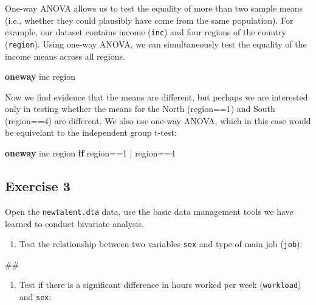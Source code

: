 \documentclass[
]{book}
\newenvironment{Shaded}{\begin{snugshade}}{\end{snugshade}}
\newcommand{\KeywordTok}[1]{\textcolor[rgb]{0.13,0.29,0.53}{\textbf{#1}}}
\newcommand{\NormalTok}[1]{#1}
\providecommand{\tightlist}{%
  \setlength{\itemsep}{0pt}\setlength{\parskip}{0pt}}
\begin{document}
One-way ANOVA allows us to test the equality of more than two sample means (i.e., whether they could plausibly have come from the same population). For example, our dataset contains income (\texttt{inc}) and four regions of the country (\texttt{region}). Using one-way ANOVA, we can simultaneously test the equality of the income means across all regions.

\begin{Shaded}
\begin{Highlighting}[]
\KeywordTok{oneway}\NormalTok{ inc region }
\end{Highlighting}
\end{Shaded}

Now we find evidence that the means are different, but perhaps we are interested only in testing whether the means for the North (region==1) and South (region==4) are different. We also use one-way ANOVA, which in this case would be equivelant to the independent group t-test:

\begin{Shaded}
\begin{Highlighting}[]
\KeywordTok{oneway}\NormalTok{ inc region }\KeywordTok{if}\NormalTok{ region==1 | region==4}
\end{Highlighting}
\end{Shaded}

\hypertarget{exercise-3-4}{%
\subsection{Exercise 3}\label{exercise-3-4}}

Open the \texttt{newtalent.dta} data, use the basic data management tools we have learned to conduct bivariate analysis.

\begin{enumerate}
\def\labelenumi{\arabic{enumi}.}
\tightlist
\item
  Test the relationship between two variables \texttt{sex} and type of main job (\texttt{job}):
\end{enumerate}

\begin{Shaded}
\begin{Highlighting}[]
\NormalTok{\#\#}
\end{Highlighting}
\end{Shaded}

\begin{enumerate}
\def\labelenumi{\arabic{enumi}.}
\setcounter{enumi}{1}
\tightlist
\item
  Test if there is a significant difference in hours worked per week (\texttt{workload}) and \texttt{sex}:
\end{enumerate}
\end{document}
